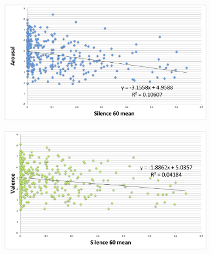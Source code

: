 \begin{figure}
         \centering
        \begin{subfigure}[b]{0.48\textwidth}
                \includegraphics[width=\textwidth]{Figures/silence60mean-arousal}
			   \vspace{20pt}
        \end{subfigure}
        \begin{subfigure}[b]{0.48\textwidth}
                \includegraphics[width=\textwidth]{Figures/silence60mean-valence}
                  \vspace{20pt}
        \end{subfigure}


\end{figure}
